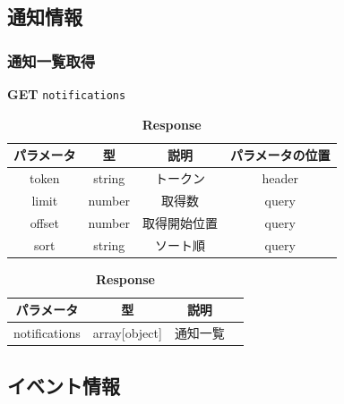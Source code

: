 \subsection{通知情報}
\subsubsection*{通知一覧取得}
\textbf{GET} \texttt{notifications}
\begin{table}[H]
  \begin{minipage}
    {0.5\hsize} \centering
    \captionsetup{labelformat=empty,labelsep=none}
    \caption{\textbf{Request}}
    \begin{tabular}{|c|c|c|c|} \hline
      パラメータ  & 型      & 説明     & パラメータの位置 \\ \hline \hline
      token  & string & トークン   & header   \\ \hline
      limit  & number & 取得数    & query    \\ \hline
      offset & number & 取得開始位置 & query    \\ \hline
      sort   & string & ソート順   & query    \\ \hline
    \end{tabular}
  \end{minipage}
  \begin{minipage}
    {0.5\hsize} \centering
    \captionsetup{labelformat=empty,labelsep=none}
    \caption{\textbf{Response}}
    \begin{tabular}{|c|c|c|c|} \hline
      パラメータ         & 型             & 説明   \\ \hline \hline
      notifications & array[object] & 通知一覧 \\ \hline
    \end{tabular}
  \end{minipage}
\end{table}
\hrulefill
\subsection{イベント情報}
